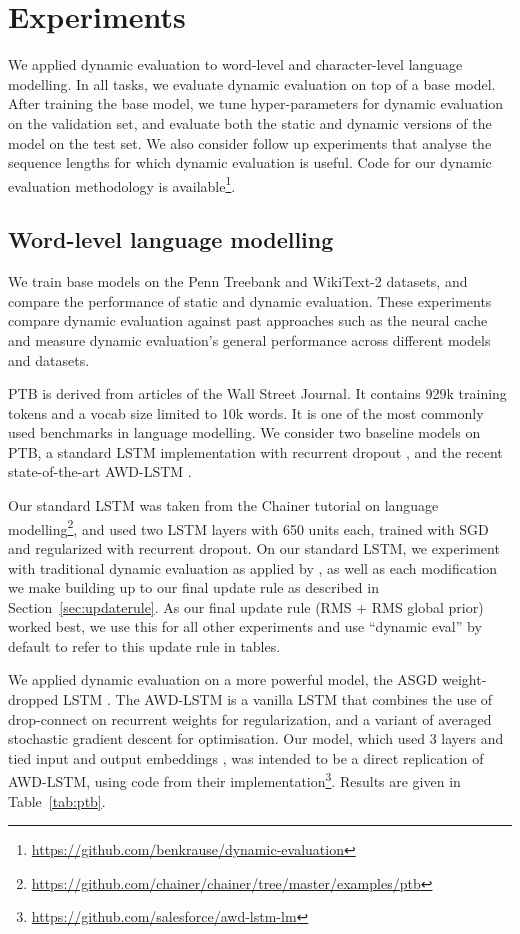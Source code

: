 \documentclass{article} \usepackage{iclr2018_conference,times}
\begin{document}
\section{Experiments}

We applied dynamic evaluation to word-level and character-level language modelling.  In all tasks, we evaluate dynamic evaluation on top of a base model. After training the base model, we tune hyper-parameters for dynamic evaluation on the validation set, and evaluate both the static and dynamic versions of the model on the test set. We also consider follow up experiments that analyse the sequence lengths for which dynamic evaluation is useful. Code for our dynamic evaluation methodology is available\footnote{\url{https://github.com/benkrause/dynamic-evaluation}}.


\subsection{Word-level language modelling}
\label{sec:ptb}
We train base models on the Penn Treebank \citep[PTB,][]{marcus1993} and WikiText-2 \citep{Merity2016} datasets, and compare the performance of static and dynamic evaluation. These experiments compare dynamic evaluation against past approaches such as the neural cache and measure dynamic evaluation's general performance across different models and datasets. 

PTB is derived from articles of the Wall Street Journal. It contains 929k training tokens and a vocab size limited to 10k words. It is one of the most commonly used benchmarks in language modelling. We consider two baseline models on PTB, a standard LSTM implementation with recurrent dropout \citep{Zaremba-2014}, and the recent state-of-the-art AWD-LSTM \citep{merity2017}. 

Our standard LSTM was taken from the Chainer tutorial on language modelling\footnote{\url{https://github.com/chainer/chainer/tree/master/examples/ptb}}, and used two LSTM layers with 650 units each, trained with SGD and regularized with recurrent dropout. On our standard LSTM, we experiment with traditional dynamic evaluation as applied by \citet{mikolov2010}, as well as each modification we make building up to our final update rule as described in Section~\ref{sec:updaterule}. As our final update rule (RMS + RMS global prior) worked best, we use this for all other experiments and use ``dynamic eval'' by default to refer to this update rule in tables. 

We applied dynamic evaluation on a more powerful model, the ASGD weight-dropped LSTM \citep[AWD-LSTM,][]{merity2017}. The AWD-LSTM is a vanilla LSTM that combines the use of drop-connect \citep{wan2013} on recurrent weights for regularization, and a variant of averaged stochastic gradient descent \citep{polyak1992} for optimisation. Our model, which used 3 layers and tied input and output embeddings \citep{press2017,inan2017}, was intended to be a direct replication of AWD-LSTM, using code from their implementation\footnote{\url{https://github.com/salesforce/awd-lstm-lm}}. Results are given in Table~\ref{tab:ptb}.
\end{document}
